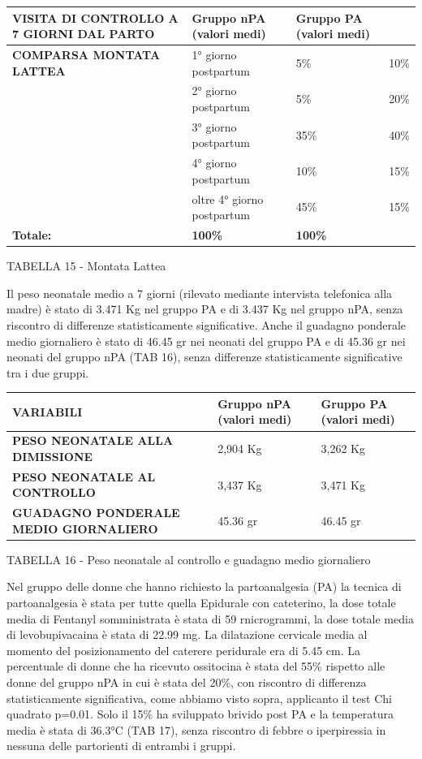 \documentclass[]{article}
\begin{document}
\begin{longtable}[]{@{}llll@{}}
\toprule
\textbf{VISITA DI CONTROLLO A 7 GIORNI DAL PARTO} & \textbf{Gruppo nPA
(valori medi)} & \textbf{Gruppo PA (valori medi)} &\tabularnewline
\midrule
\endhead
\textbf{COMPARSA MONTATA LATTEA} & 1° giorno postpartum & 5\% &
10\%\tabularnewline
& 2° giorno postpartum & 5\% & 20\%\tabularnewline
& 3° giorno postpartum & 35\% & 40\%\tabularnewline
& 4° giorno postpartum & 10\% & 15\%\tabularnewline
& oltre 4° giorno postpartum & 45\% & 15\%\tabularnewline
\textbf{Totale:} & \textbf{100\%} & \textbf{100\%} &\tabularnewline
\bottomrule
\end{longtable}

TABELLA 15 - Montata Lattea

Il peso neonatale medio a 7 giorni (rilevato mediante intervista
telefonica alla madre) è stato di 3.471 Kg nel gruppo PA e di 3.437 Kg
nel gruppo nPA, senza riscontro di differenze statisticamente
significative. Anche il guadagno ponderale medio giornaliero è stato di
46.45 gr nei neonati del gruppo PA e di 45.36 gr nei neonati del gruppo
nPA (TAB 16), senza differenze statisticamente significative tra i due
gruppi.

\begin{longtable}[]{@{}lll@{}}
\toprule
\textbf{VARIABILI} & \textbf{Gruppo nPA (valori medi)} & \textbf{Gruppo
PA (valori medi)}\tabularnewline
\midrule
\endhead
\textbf{PESO NEONATALE ALLA DIMISSIONE} & 2,904 Kg & 3,262
Kg\tabularnewline
\textbf{PESO NEONATALE AL CONTROLLO} & 3,437 Kg & 3,471
Kg\tabularnewline
\textbf{GUADAGNO PONDERALE MEDIO GIORNALIERO} & 45.36 gr & 46.45
gr\tabularnewline
\bottomrule
\end{longtable}

TABELLA 16 - Peso neonatale al controllo e guadagno medio giornaliero

Nel gruppo delle donne che hanno richiesto la partoanalgesia (PA) la
tecnica di partoanalgesia è stata per tutte quella Epidurale con
cateterino, la dose totale media di Fentanyl somministrata è stata di 59
rnicrogrammi, la dose totale media di levobupivacaina è stata di 22.99
mg. La dilatazione cervicale media al momento del posizionamento del
caterere peridurale era di 5.45 cm. La percentuale di donne che ha
ricevuto ossitocina è stata del 55\% rispetto alle donne del gruppo nPA
in cui è stata del 20\%, con riscontro di differenza statisticamente
significativa, come abbiamo visto sopra, applicanto il test Chi quadrato
p=0.01. Solo il 15\% ha sviluppato brivido post PA e la temperatura
media è stata di 36.3°C (TAB 17), senza riscontro di febbre o
iperpiressia in nessuna delle partorienti di entrambi i gruppi.
\end{document}
